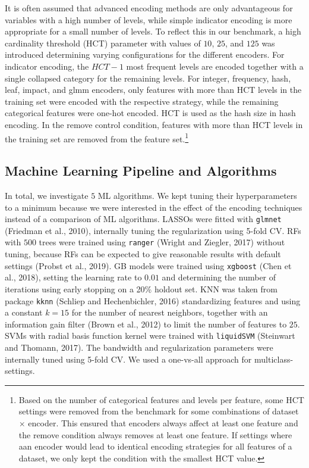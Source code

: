 \documentclass[smallextended]{svjour3}       %
\begin{document}
It is often assumed that advanced encoding methods are only advantageous for variables with a high number of levels, while simple indicator encoding is more appropriate for a small number of levels.
To reflect this in our benchmark, a high cardinality threshold (HCT) parameter with values of \(10\), \(25\), and \(125\) was introduced determining varying configurations for the different encoders.
For indicator encoding, the \(HCT - 1\) most frequent levels are encoded together with a single collapsed category for the remaining levels.
For integer, frequency, hash, leaf, impact, and glmm encoders, only features with more than HCT levels in the training set were encoded with the respective strategy, while the remaining categorical features were one-hot encoded. HCT is used as the hash size in hash encoding.
In the remove control condition, features with more than HCT levels in the training set are removed from the feature set.\footnote{Based on the number of categorical features and levels per feature, some HCT settings were removed from the benchmark for some combinations of dataset $\times$ encoder.
This ensured that encoders always affect at least one feature and the remove condition always removes at least one feature.
If settings where aan encoder would lead to identical encoding strategies for all features of a dataset, we only kept the condition with the smallest HCT value.}

\hypertarget{machine-learning-pipeline-and-algorithms}{%
\subsection{Machine Learning Pipeline and Algorithms}\label{machine-learning-pipeline-and-algorithms}}

\label{sec:pipeline}

In total, we investigate \(5\) ML algorithms. We kept tuning their hyperparameters to a minimum because we were interested in the effect of the encoding techniques instead of a comparison of ML algorithms.
LASSOs were fitted with \texttt{glmnet} (Friedman et al., 2010), internally tuning the regularization using 5-fold CV.
RFs with \(500\) trees were trained using \texttt{ranger} (Wright and Ziegler, 2017) without tuning, because RFs can be expected to give reasonable results with default settings (Probst et al., 2019).
GB models were trained using \texttt{xgboost} (Chen et al., 2018), setting the learning rate to \(0.01\) and determining the number of iterations using early stopping on a 20\% holdout set.
KNN was taken from package \texttt{kknn} (Schliep and Hechenbichler, 2016) standardizing features and using a constant \(k=15\) for the number of nearest neighbors, together with an information gain filter (Brown et al., 2012) to limit the number of features to \(25\).
SVMs with radial basis function kernel were trained with \texttt{liquidSVM} (Steinwart and Thomann, 2017).
The bandwidth and regularization parameters were internally tuned using 5-fold CV. We used a one-vs-all approach for multiclass-settings.
\end{document}
